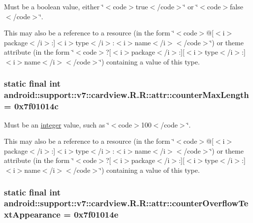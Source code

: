 Must be a boolean value, either \char`\"{}$<$code$>$true$<$/code$>$\char`\"{} or \char`\"{}$<$code$>$false$<$/code$>$\char`\"{}. 

This may also be a reference to a resource (in the form \char`\"{}$<$code$>$@\mbox{[}$<$i$>$package$<$/i$>$:\mbox{]}$<$i$>$type$<$/i$>$:$<$i$>$name$<$/i$>$$<$/code$>$\char`\"{}) or theme attribute (in the form \char`\"{}$<$code$>$?\mbox{[}$<$i$>$package$<$/i$>$:\mbox{]}\mbox{[}$<$i$>$type$<$/i$>$:\mbox{]}$<$i$>$name$<$/i$>$$<$/code$>$\char`\"{}) containing a value of this type. \hypertarget{classandroid_1_1support_1_1v7_1_1cardview_1_1_r_1_1attr_4f9c3b0cb3e6ffef8fb4854c85920688}{
\subsubsection[{counterMaxLength}]{\setlength{\rightskip}{0pt plus 5cm}static final int android::support::v7::cardview.R.R::attr::counterMaxLength = 0x7f01014c}}
\label{classandroid_1_1support_1_1v7_1_1cardview_1_1_r_1_1attr_4f9c3b0cb3e6ffef8fb4854c85920688}


Must be an \hyperlink{classandroid_1_1support_1_1v7_1_1cardview_1_1_r_1_1integer}{integer} value, such as \char`\"{}$<$code$>$100$<$/code$>$\char`\"{}. 

This may also be a reference to a resource (in the form \char`\"{}$<$code$>$@\mbox{[}$<$i$>$package$<$/i$>$:\mbox{]}$<$i$>$type$<$/i$>$:$<$i$>$name$<$/i$>$$<$/code$>$\char`\"{}) or theme attribute (in the form \char`\"{}$<$code$>$?\mbox{[}$<$i$>$package$<$/i$>$:\mbox{]}\mbox{[}$<$i$>$type$<$/i$>$:\mbox{]}$<$i$>$name$<$/i$>$$<$/code$>$\char`\"{}) containing a value of this type. \hypertarget{classandroid_1_1support_1_1v7_1_1cardview_1_1_r_1_1attr_3e9737c620c866ccd7654195558e9d47}{
\subsubsection[{counterOverflowTextAppearance}]{\setlength{\rightskip}{0pt plus 5cm}static final int android::support::v7::cardview.R.R::attr::counterOverflowTextAppearance = 0x7f01014e}}
\label{classandroid_1_1support_1_1v7_1_1cardview_1_1_r_1_1attr_3e9737c620c866ccd7654195558e9d47}


